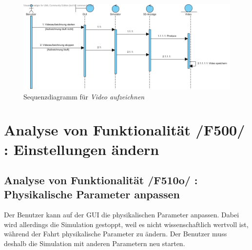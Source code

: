\begin{figure}[!h]
\includegraphics[width=\linewidth]{bilder/Video_aufzeichnen}
\caption{Sequenzdiagramm für \textit{Video aufzeichnen}}
\end{figure}

\section{Analyse von Funktionalität /F500/ :  Einstellungen ändern}
\subsection{Analyse von Funktionalität /F510o/ :  Physikalische Parameter anpassen}
Der Benutzer kann auf der GUI die physikalischen Parameter anpassen. Dabei wird allerdings die Simulation gestoppt, weil es nicht wissenschaftlich wertvoll ist, während der Fahrt physikalische Parameter zu ändern. Der Benutzer muss deshalb die Simulation mit anderen Parametern neu starten.


